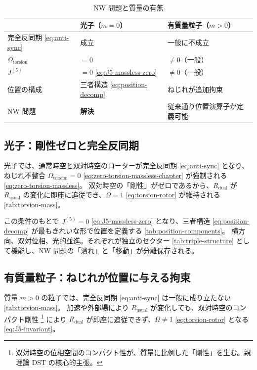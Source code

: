 \documentclass[dvipdfmx,a4paper,oneside]{jsbook}
\numberwithin{equation}{chapter}
\begin{document}
\begin{table}[htbp]
  \centering
  \caption{NW 問題と質量の有無}
  \label{tab:nw-mass-contrast}
  \begin{tabular}{@{}lll@{}}
    \toprule
    & 光子（\(m = 0\)） & 有質量粒子（\(m > 0\)） \\
    \midrule
    完全反同期 \eqref{eq:anti-sync} & 成立 & 一般に不成立 \\
    \(\Omega_{\mathrm{torsion}}\) & \(= 0\) & \(\neq 0\)（一般） \\
    \(J^{(5)}\) & \(= 0\) \eqref{eq:J5-massless-zero} & \(\neq 0\)（一般） \\
    位置の構成 & 三者構造 \eqref{eq:position-decomp} & ねじれが追加拘束 \\
    NW 問題 & \textbf{解決} & 従来通り位置演算子が定義可能 \\
    \bottomrule
  \end{tabular}
\end{table}

\subsection{光子：剛性ゼロと完全反同期}

光子では、通常時空と双対時空のローターが完全反同期 \eqref{eq:anti-sync} となり、ねじれ不整合 \(\Omega_{\mathrm{torsion}} = 0\) \eqref{eq:zero-torsion-massless-chapter} が強制される \eqref{eq:zero-torsion-massless}。
双対時空の「剛性」がゼロであるから、\(R_{\mathrm{dual}}\) が \(R_{\mathrm{usual}}\) の変化に即座に追従でき、\(\Omega = 1\) \eqref{eq:torsion-rotor} が維持される \eqref{tab:torsion-mass}。

この条件のもとで \(J^{(5)} = 0\) \eqref{eq:J5-massless-zero} となり、三者構造 \eqref{eq:position-decomp} が最もきれいな形で位置を定義する \eqref{tab:position-components}。
横方向、双対位相、光的並進。それぞれが独立のセクター \eqref{tab:triple-structure} として機能し、NW 問題の「潰れ」と「移動」が分離保存される。

\subsection{有質量粒子：ねじれが位置に与える拘束}

質量 \(m > 0\) の粒子では、完全反同期 \eqref{eq:anti-sync} は一般に成り立たない \eqref{tab:torsion-mass}。
加速や外部場により \(R_{\mathrm{usual}}\) が変化しても、双対時空のコンパクト剛性 \footnote{双対時空の位相空間のコンパクト性が、質量に比例した「剛性」を生む。親理論 DST の核心的主張。} により \(R_{\mathrm{dual}}\) が即座に追従できず、\(\Omega \neq 1\) \eqref{eq:torsion-rotor} となる \eqref{eq:J5-invariant}。
\end{document}
